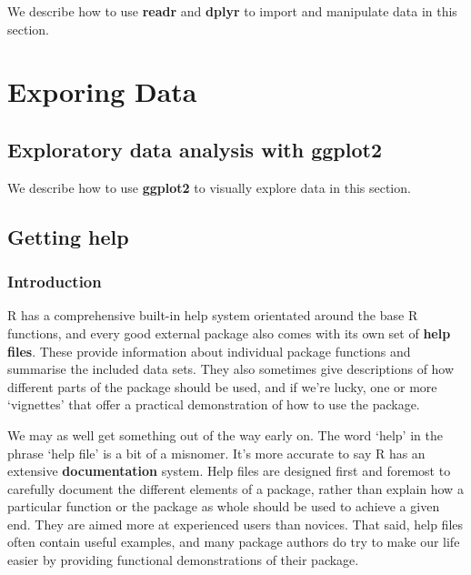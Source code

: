 \documentclass[
]{book}
\begin{document}
We describe how to use \textbf{readr} and \textbf{dplyr} to import and manipulate data in this section.

\hypertarget{part-exporing-data}{%
\part{Exporing Data}\label{part-exporing-data}}

\hypertarget{exploratory-data-analysis-with-ggplot2}{%
\chapter{\texorpdfstring{Exploratory data analysis with \textbf{ggplot2}}{Exploratory data analysis with ggplot2}}\label{exploratory-data-analysis-with-ggplot2}}

We describe how to use \textbf{ggplot2} to visually explore data in this section.

\hypertarget{appendix-supplementary-material}{%
\appendix}


\hypertarget{getting-help}{%
\chapter{Getting help}\label{getting-help}}

\hypertarget{console-help}{%
\section{Introduction}\label{console-help}}

R has a comprehensive built-in help system orientated around the base R functions, and every good external package also comes with its own set of \textbf{help files}. These provide information about individual package functions and summarise the included data sets. They also sometimes give descriptions of how different parts of the package should be used, and if we're lucky, one or more `vignettes' that offer a practical demonstration of how to use the package.

We may as well get something out of the way early on. The word `help' in the phrase `help file' is a bit of a misnomer. It's more accurate to say R has an extensive \textbf{documentation} system. Help files are designed first and foremost to carefully document the different elements of a package, rather than explain how a particular function or the package as whole should be used to achieve a given end. They are aimed more at experienced users than novices. That said, help files often contain useful examples, and many package authors do try to make our life easier by providing functional demonstrations of their package.
\end{document}
